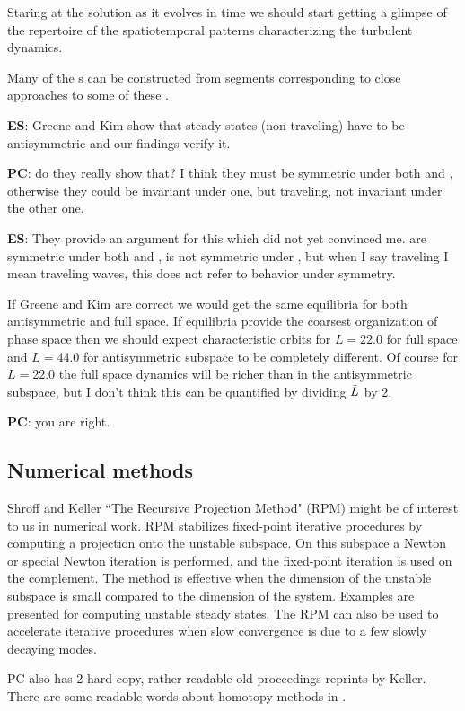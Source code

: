 Staring at the solution
 as it evolves in time we should start getting a glimpse of the
 repertoire of the spatiotemporal patterns characterizing
 the turbulent dynamics.

Many of the \rpo s can be constructed from segments corresponding to
close approaches to some of these \eqva.

\textbf{ES}: Greene and Kim show that steady states (non-traveling)
have to be antisymmetric and our findings verify it.

\textbf{PC}: do they really show that? I think they must be symmetric under both
{\Refl} and \Shift, otherwise they could be invariant under one,
but traveling, not invariant under the other one.

\textbf{ES}: They provide an argument for this which did not yet convinced me.
 are symmetric under both {\Refl} and \Shift,  is not
symmetric under \Shift, but when I say traveling I mean traveling waves,
this does not refer to behavior under symmetry.

If Greene and Kim
are correct we would get the same equilibria for both
antisymmetric and full space. If equilibria provide the coarsest organization
of phase space then we should expect characteristic orbits for $L=22.0$
for full space and $L=44.0$ for antisymmetric subspace to be completely different.
Of course for $L=22.0$ the full space dynamics will be richer than
in the
antisymmetric subspace, but I don't think this can be quantified by
dividing $\tilde{L}$ by $2$.

\textbf{PC}: you are right.


\subsection*{Numerical methods}

Shroff and Keller
``The Recursive Projection Method" (RPM)
might be of interest to us in numerical work.
RPM stabilizes fixed-point iterative
procedures by computing a projection onto the unstable subspace.
On this subspace a Newton or special Newton iteration is performed,
and the fixed-point iteration is used on the complement.
The method is effective when the dimension of the unstable subspace
is small compared to the dimension of the system.
Examples are presented for computing unstable steady states.
The RPM can also be used to accelerate iterative procedures when
slow convergence is due to a few slowly decaying modes.

PC also has 2 hard-copy, rather readable
old proceedings reprints by Keller.
There are some readable words about homotopy methods in
.

